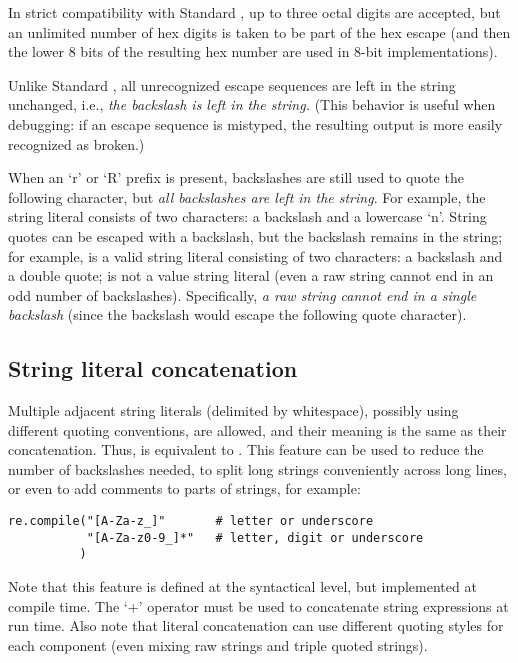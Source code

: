 In strict compatibility with Standard \C, up to three octal digits are
accepted, but an unlimited number of hex digits is taken to be part of
the hex escape (and then the lower 8 bits of the resulting hex number
are used in 8-bit implementations).

Unlike Standard \C{},
all unrecognized escape sequences are left in the string unchanged,
i.e., \emph{the backslash is left in the string.}  (This behavior is
useful when debugging: if an escape sequence is mistyped, the
resulting output is more easily recognized as broken.)

When an `r' or `R' prefix is present, backslashes are still used to
quote the following character, but \emph{all backslashes are left in
the string}.  For example, the string literal  consists
of two characters: a backslash and a lowercase `n'.  String quotes can
be escaped with a backslash, but the backslash remains in the string;
for example,  is a valid string literal consisting of two
characters: a backslash and a double quote;  is not a value
string literal (even a raw string cannot end in an odd number of
backslashes).  Specifically, \emph{a raw string cannot end in a single
backslash} (since the backslash would escape the following quote
character).

\subsection{String literal concatenation}

Multiple adjacent string literals (delimited by whitespace), possibly
using different quoting conventions, are allowed, and their meaning is
the same as their concatenation.  Thus,  is
equivalent to .  This feature can be used to reduce
the number of backslashes needed, to split long strings conveniently
across long lines, or even to add comments to parts of strings, for
example:

\begin{verbatim}
re.compile("[A-Za-z_]"       # letter or underscore
           "[A-Za-z0-9_]*"   # letter, digit or underscore
          )
\end{verbatim}

Note that this feature is defined at the syntactical level, but
implemented at compile time.  The `+' operator must be used to
concatenate string expressions at run time.  Also note that literal
concatenation can use different quoting styles for each component
(even mixing raw strings and triple quoted strings).

